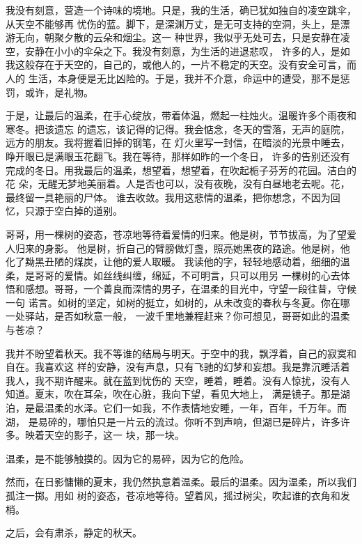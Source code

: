 		我没有刻意，营造一个诗味的境地。只是，我的生活，确已犹如独自的凌空跳伞，从天空不能够再
	忧伤的蓝。脚下，是深渊万丈，是无可支持的空洞，头上，是漂游无向，朝聚夕散的云朵和烟尘。这一
	种世界，我似乎无处可去，只是安静在凌空，安静在小小的伞朵之下。我没有刻意，为生活的进退悲叹，
	许多的人，是如我这般存在于天空的，自己的，或他人的，一片不稳定的天空。没有安全可言，而人的
	生活，本身便是无比凶险的。于是，我并不介意，命运中的遭受，那不是惩罚，或许，是礼物。

		于是，让最后的温柔，在手心绽放，带着体温，燃起一柱烛火。温暖许多个雨夜和寒冬。把该遗忘
	的遗忘，该记得的记得。我会惦念，冬天的雪落，无声的庭院，远方的朋友。我将握着旧掉的钢笔，在
	灯火里写一封信，在暗淡的光景中睡去，睁开眼已是满眼玉花翻飞。我在等待，那样如昨的一个冬日，
	许多的告别还没有完成的冬日。用我最后的温柔，想望着，想望着，在吹起栀子芬芳的花园。洁白的花
	朵，无醒无梦地美丽着。人是否也可以，没有夜晚，没有白昼地老去呢。花，最终留一具艳丽的尸体。
	谁去收敛。我用这悲情的温柔，把你想念，不因为回忆，只源于空白掉的道别。

		哥哥，用一棵树的姿态，苍凉地等待着爱情的归来。他是树，节节拔高，为了望爱人归来的身影。
	他是树，折自己的臂膀做灯盏，照亮她黑夜的路途。他是树，他化了黝黑丑陋的煤炭，让他的爱人取暖。
	我读他的字，轻轻地感动着，细细的温柔，是哥哥的爱情。如丝线纠缠，绵延，不可明言，只可以用另
	一棵树的心去体悟和感想。哥哥，一个善良而深情的男子，在温柔的目光中，守望一段往昔，守候一句
	诺言。如树的坚定，如树的挺立，如树的，从未改变的春秋与冬夏。你在哪一处驿站，是否如秋意一般，
	一波千里地兼程赶来？你可想见，哥哥如此的温柔与苍凉？

		我并不盼望着秋天。我不等谁的结局与明天。于空中的我，飘浮着，自己的寂寞和自在。我喜欢这
	样的安静，没有声息，只有飞驰的幻梦和妄想。我是靠沉睡活着我人，我不期许醒来。就在蓝到忧伤的
	天空，睡着，睡着。没有人惊扰，没有人知道。夏末，吹在耳朵，吹在心脏，我向下望，看见大地上，
	满是镜子。那是湖泊，是最温柔的水泽。它们一如我，不作表情地安睡，一年，百年，千万年。而湖，
	是易碎的，哪怕只是一片云的流过。你听不到声响，但湖已是碎片，许多许多。映着天空的影子，这一
	块，那一块。

		\vspace{1em}
		温柔，是不能够触摸的。因为它的易碎，因为它的危险。

		然而，在日影慵懒的夏末，我仍然执意着温柔。最后的温柔。因为温柔，所以我们孤注一掷。用如
	树的姿态，苍凉地等待。望着风，摇过树尖，吹起谁的衣角和发梢。

		\vspace{1em}
		之后，会有肃杀，静定的秋天。

